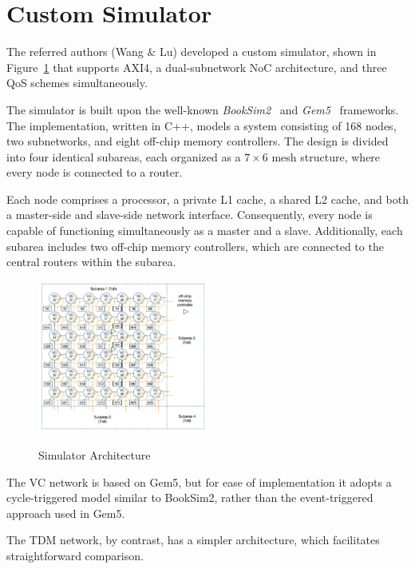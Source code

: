 \section{Custom Simulator}
The referred authors (Wang \& Lu) developed a custom simulator, shown in Figure~\ref{fig:simulator_architecture} that supports AXI4, a dual-subnetwork NoC architecture, and three QoS schemes simultaneously.

The simulator is built upon the well-known \textit{BookSim2}~\cite{jiang_detailed_2013} and \textit{Gem5}~\cite{gem5_gem5_nodate} frameworks.
The implementation, written in C++, models a system consisting of 168 nodes, two subnetworks, and eight off-chip memory controllers. The design is divided into four identical subareas, each organized as a $7 \times 6$ mesh structure, where every node is connected to a router.

Each node comprises a processor, a private L1 cache, a shared L2 cache, and both a master-side and slave-side network interface. Consequently, every node is capable of functioning simultaneously as a master and a slave. Additionally, each subarea includes two off-chip memory controllers, which are connected to the central routers within the subarea.

\begin{figure}[htbp]
    \centering
    \includegraphics[width=0.5\textwidth]{img/Simulator_Architecture.png}
    \caption{Simulator Architecture}
    \cite{abderazek_multicore_2013}
    \label{fig:simulator_architecture}
\end{figure}

The \ac{VC} network is based on Gem5, but for ease of implementation it adopts a cycle-triggered model similar to BookSim2, rather than the event-triggered approach used in Gem5. 

The \ac{TDM} network, by contrast, has a simpler architecture, which facilitates straightforward comparison. 

